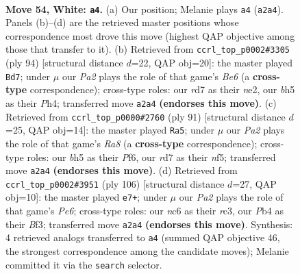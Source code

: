 \documentclass[11pt]{article}
\begin{document}
\clearpage

\begin{figure}[p]\centering
\begin{subfigure}{0.46\textwidth}\centering
\resizebox{\linewidth}{!}{%
\newchessgame
\chessboard[
  setfen={1k6/3r4/p1n2P2/7b/1P6/2B5/P6K/5R2 w - - 13 54},
  showmover=false,
  pgfstyle=straightmove, color=movearrow, markmove={a2-a4}
]}
\caption{}
\end{subfigure}\hfill
\begin{subfigure}{0.46\textwidth}\centering
\resizebox{\linewidth}{!}{%
\newchessgame
\chessboard[
  setfen={8/p5k1/3bB3/1p6/1P5P/7P/4n3/4B2K w - - 1 48},
  showmover=false,
  pgfstyle=straightmove, color=movearrow, markmove={e6-d7}
]}
\caption{}
\end{subfigure}
\\[4pt]
\begin{subfigure}{0.46\textwidth}\centering
\resizebox{\linewidth}{!}{%
\newchessgame
\chessboard[
  setfen={8/5k2/1p3p2/2b2N2/6PP/8/1R4K1/r7 b - - 2 46},
  showmover=false,
  pgfstyle=straightmove, color=movearrow, markmove={a1-a5}
]}
\caption{}
\end{subfigure}\hfill
\begin{subfigure}{0.46\textwidth}\centering
\resizebox{\linewidth}{!}{%
\newchessgame
\chessboard[
  setfen={5k2/8/3PPp2/8/4P1P1/2r2B1p/8/6K1 w - - 8 54},
  showmover=false,
  pgfstyle=straightmove, color=movearrow, markmove={e6-e7}
]}
\caption{}
\end{subfigure}
\caption{\textbf{Move 54, White: \texttt{a4}.} (a) Our position; Melanie plays \texttt{a4} (\texttt{a2a4}). Panels (b)--(d) are the retrieved master positions whose correspondence most drove this move (highest QAP objective among those that transfer to it). (b) Retrieved from \texttt{ccrl\_top\_p0002\#3305} (ply 94) [structural distance $d$=22, QAP obj=20]: the master played \texttt{Bd7}; under $\mu$ our \emph{Pa2} plays the role of that game's \emph{Be6} (a \textbf{cross-type} correspondence); cross-type roles: our \emph{r}d7 as their \emph{n}e2, our \emph{b}h5 as their \emph{P}h4; transferred move \texttt{a2a4} \textbf{(endorses this move)}. (c) Retrieved from \texttt{ccrl\_top\_p0000\#2760} (ply 91) [structural distance $d$=25, QAP obj=14]: the master played \texttt{Ra5}; under $\mu$ our \emph{Pa2} plays the role of that game's \emph{Ra8} (a \textbf{cross-type} correspondence); cross-type roles: our \emph{b}h5 as their \emph{P}f6, our \emph{r}d7 as their \emph{n}f5; transferred move \texttt{a2a4} \textbf{(endorses this move)}. (d) Retrieved from \texttt{ccrl\_top\_p0002\#3951} (ply 106) [structural distance $d$=27, QAP obj=10]: the master played \texttt{e7+}; under $\mu$ our \emph{Pa2} plays the role of that game's \emph{Pe6}; cross-type roles: our \emph{n}c6 as their \emph{r}c3, our \emph{P}b4 as their \emph{B}f3; transferred move \texttt{a2a4} \textbf{(endorses this move)}. Synthesis: 4 retrieved analogs transferred to \texttt{a4} (summed QAP objective 46, the strongest correspondence among the candidate moves); Melanie committed it via the \texttt{search} selector.}
\label{fig:thought-m106}
\end{figure}
\end{document}
